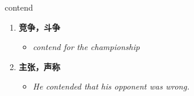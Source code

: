 
\begin{frame}
{\huge contend}
\begin{center}
\begin{enumerate}\Large
  \item \textbf{竞争，斗争}
  \begin{itemize}
    \item \em{\Large{contend for the championship}}
  \end{itemize}
  \item \textbf{主张，声称}
  \begin{itemize}
    \item \em{\Large{He contended that his opponent was wrong.}}
  \end{itemize}
\end{enumerate}
\end{center}
\end{frame}
